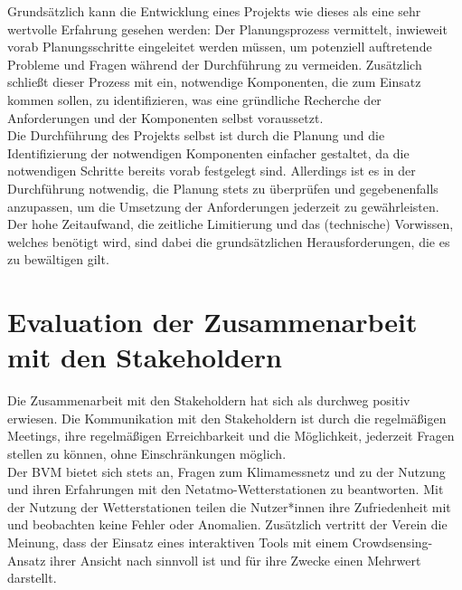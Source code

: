 Grundsätzlich kann die Entwicklung eines Projekts wie dieses als eine sehr wertvolle Erfahrung gesehen werden: Der Planungsprozess vermittelt, inwieweit vorab Planungsschritte eingeleitet werden müssen, um potenziell auftretende Probleme und Fragen während der Durchführung zu vermeiden. Zusätzlich schließt dieser Prozess mit ein, notwendige Komponenten, die zum Einsatz kommen sollen, zu identifizieren, was eine gründliche Recherche der Anforderungen und der Komponenten selbst voraussetzt. \\ Die Durchführung des Projekts selbst ist durch die Planung und die Identifizierung der notwendigen Komponenten einfacher gestaltet, da die notwendigen Schritte bereits vorab festgelegt sind. Allerdings ist es in der Durchführung notwendig, die Planung stets zu überprüfen und gegebenenfalls anzupassen, um die Umsetzung der Anforderungen jederzeit zu gewährleisten. Der hohe Zeitaufwand, die zeitliche Limitierung und das (technische) Vorwissen, welches benötigt wird, sind dabei die grundsätzlichen Herausforderungen, die es zu bewältigen gilt.


\section{Evaluation der Zusammenarbeit mit den Stakeholdern}
\label{sec:evaluationstakeholder}
Die Zusammenarbeit mit den Stakeholdern hat sich als durchweg positiv erwiesen. Die Kommunikation mit den Stakeholdern ist durch die regelmäßigen Meetings, ihre regelmäßigen Erreichbarkeit und die Möglichkeit, jederzeit Fragen stellen zu können, ohne Einschränkungen möglich. \\ Der \ac{BVM} bietet sich stets an, Fragen zum Klimamessnetz und zu der Nutzung und ihren Erfahrungen mit den Netatmo-Wetterstationen zu beantworten. Mit der Nutzung der Wetterstationen teilen die Nutzer*innen ihre Zufriedenheit mit und beobachten keine Fehler oder Anomalien. Zusätzlich vertritt der Verein die Meinung, dass der Einsatz eines interaktiven Tools mit einem Crowdsensing-Ansatz ihrer Ansicht nach sinnvoll ist und für ihre Zwecke einen Mehrwert darstellt. 


